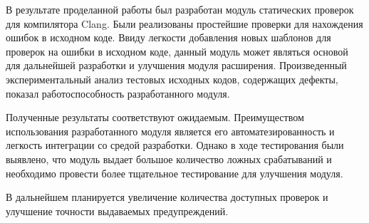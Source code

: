 \conclusion
В результате проделанной работы был разработан модуль статических проверок для компилятора Clang.
Были реализованы простейшие проверки для нахождения ошибок в исходном коде. Ввиду легкости добавления новых 
шаблонов для проверок на ошибки в исходном коде, данный модуль может являться основой для дальнейшей 
разработки и улучшения модуля расширения. 
Произведенный экспериментальный анализ тестовых исходных кодов, содержащих дефекты, показал
работоспособность разработанного модуля. 

Полученные результаты соответствуют ожидаемым. Преимуществом использования разработанного модуля
является его автоматезированность и легкость интеграции со средой разработки. Однако в ходе тестирования были
выявлено, что модуль выдает большое количество ложных срабатываний и необходимо провести более
тщательное тестирование для улучшения модуля.

В дальнейшем планируется увеличение количества доступных проверок и улучшение точности выдаваемых
предупреждений.
